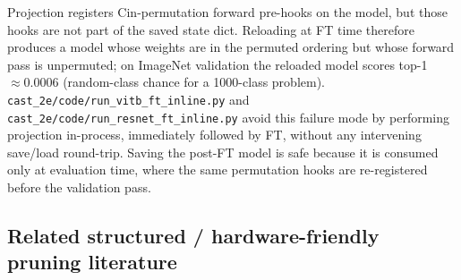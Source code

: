 \documentclass[11pt]{article}
\theoremstyle{plain}
\theoremstyle{definition}
\theoremstyle{remark}
\newcommand{\1}{\mathbf{1}}
\begin{document}
Projection registers Cin-permutation forward pre-hooks on the model, but those hooks are not part of the saved state dict. Reloading at FT time therefore produces a model whose weights are in the permuted ordering but whose forward pass is unpermuted; on ImageNet validation the reloaded model scores top-1 $\approx 0.0006$ (random-class chance for a 1000-class problem). \texttt{cast\_2e/code/run\_vitb\_ft\_inline.py} and \texttt{cast\_2e/code/run\_resnet\_ft\_inline.py} avoid this failure mode by performing projection in-process, immediately followed by FT, without any intervening save/load round-trip. Saving the post-FT model is safe because it is consumed only at evaluation time, where the same permutation hooks are re-registered before the validation pass.


\subsection{Related structured / hardware-friendly pruning literature}
\label{subsec:related-recent}
\end{document}
